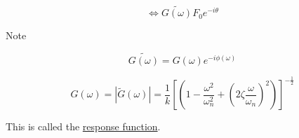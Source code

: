 \documentclass{article}
\newtheorem{one minute paper}[theorem]{One Minute Paper}
\begin{document}
\begin{equation}
    \iff \tilde{G(\omega)}F_0e^{-i\theta}
\end{equation}

Note 

\begin{equation}
    \tilde{G(\omega)} = G(\omega)e^{-i\phi(\omega)}
\end{equation}

\begin{equation}
    G(\omega) = |\tilde{G}(\omega)| = \frac{1}{k}\left[(1 - \frac{\omega^2}{\omega_n^2} + (2\zeta \frac{\omega}{\omega_n})^2)\right]^{-\frac{1}{2}}
\end{equation}

This is called the \underline{response function}. 
\end{document}
